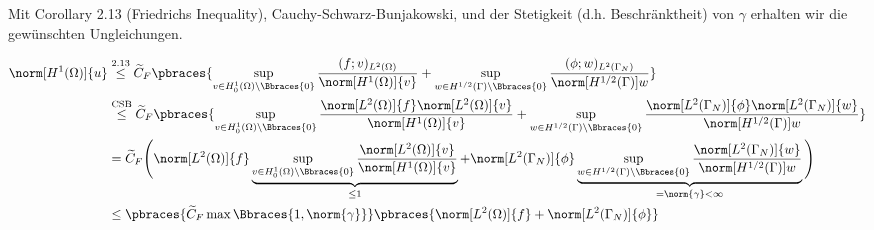 \begin{solution}
\begin{enumerate}[label = (\roman*)]
    Mit Corollary 2.13 (Friedrichs Inequality), Cauchy-Schwarz-Bunjakowski, und der Stetigkeit (d.h. Beschränktheit) von $\gamma$ erhalten wir die gewünschten Ungleichungen.

    \begin{align*}
        \norm[H^1(\Omega)]{u}
        & \stackrel{\text{2.13}}{\leq}
        \widetilde{C}_F
        \pbraces
        {
            \sup_{v \in H_0^1(\Omega) \setminus \Bbraces{0}}
            \frac
            {
                (f; v)_{L^2(\Omega)}
            }{
                \norm[H^1(\Omega)]{v}
            }
            +
            \sup_{w \in H^{1/2}(\Gamma) \setminus \Bbraces{0}}
            \frac
            {
                (\phi; w)_{L^2(\Gamma_N)}
            }{
                \norm[H^{1/2}(\Gamma)]{w}
            }
        } \\
        & \stackrel{\text{CSB}}{\leq}
        \widetilde{C}_F
        \pbraces
        {
            \sup_{v \in H_0^1(\Omega) \setminus \Bbraces{0}}
            \frac
            {
                \norm[L^2(\Omega)]{f}
                \norm[L^2(\Omega)]{v}
            }{
                \norm[H^1(\Omega)]{v}
            }
            +
            \sup_{w \in H^{1/2}(\Gamma) \setminus \Bbraces{0}}
            \frac
            {
                \norm[L^2(\Gamma_N)]{\phi}
                \norm[L^2(\Gamma_N)]{w}
            }{
                \norm[H^{1/2}(\Gamma)]{w}
            }
        } \\
        & =
        \widetilde{C}_F
        \Bigg (
            \norm[L^2(\Omega)]{f}
            \underbrace
            {
                \sup_{v \in H_0^1(\Omega) \setminus \Bbraces{0}}
                \frac
                {
                    \norm[L^2(\Omega)]{v}
                }{
                    \norm[H^1(\Omega)]{v}
                }
            }_{
                \leq 1
            }
            +
            \norm[L^2(\Gamma_N)]{\phi}
            \underbrace
            {
                \sup_{w \in H^{1/2}(\Gamma) \setminus \Bbraces{0}}
                \frac
                {
                    \norm[L^2(\Gamma_N)]{w}
                }{
                    \norm[H^{1/2}(\Gamma)]{w}
                }
            }_{
                =
                \norm{\gamma}
                <
                \infty
            }
        \Bigg ) \\
        & \leq
        \pbraces
        {
            \widetilde{C}_F
            \max \Bbraces{1, \norm{\gamma}}
        }
        \pbraces
        {
            \norm[L^2(\Omega)]{f}
            +
            \norm[L^2(\Gamma_N)]{\phi}
        }
    \end{align*}

\end{enumerate}

\end{solution}

